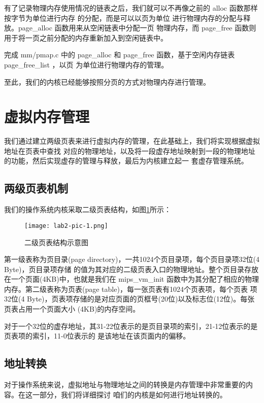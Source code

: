 有了记录物理内存使用情况的链表之后，我们就可以不再像之前的 alloc 函数那样按字节为单位进行内存
的分配，而是可以以页为单位 进行物理内存的分配与释放。page\_alloc 函数用来从空闲链表中分配一页
物理内存，而 page\_free 函数则用于将一页之前分配的内存重新加入到空闲链表中。

\begin{exercise}
完成 mm/pmap.c 中的 page\_alloc 和 page\_free 函数，基于空闲内存链表 page\_free\_list ，以页
为单位进行物理内存的管理。
\end{exercise}

至此，我们的内核已经能够按照分页的方式对物理内存进行管理。

\section{虚拟内存管理}

我们通过建立两级页表来进行虚拟内存的管理，在此基础上，我们将实现根据虚拟地址在页表中查找
对应的物理地址，以及将一段虚存地址映射到一段的物理地址的功能，然后实现虚存的管理与释放，最后为内核建立起一
套虚存管理系统。

\subsection{两级页表机制}

我们的操作系统内核采取二级页表结构，如图\ref{lab2-pic-1.png}所示：

\begin{figure}[htbp]
  \centering
  \texttt{[image: lab2-pic-1.png]}
  \caption{二级页表结构示意图}\label{lab2-pic-1.png}
\end{figure}

第一级表称为页目录(page directory)，一共1024个页目录项，每个页目录项32位(4 Byte)，页目录项存储
的值为其对应的二级页表入口的物理地址。整个页目录存放在一个页面(4KB)中，也就是我们在 mips\_vm\_init
函数中为其分配了相应的物理内存。第二级表称为页表(page table)，每一张页表有1024个页表项，每个页表
项32位(4 Byte)，页表项存储的是对应页面的页框号(20位)以及标志位(12位)。每张页表占用一个页面大小
(4KB)的内存空间。

对于一个32位的虚存地址，其31-22位表示的是页目录项的索引，21-12位表示的是页表项的索引，11-0位表示的
是该地址在该页面内的偏移。

\subsection{地址转换}

对于操作系统来说，虚拟地址与物理地址之间的转换是内存管理中非常重要的内容。在这一部分，我们将详细探讨
咱们的内核是如何进行地址转换的。

